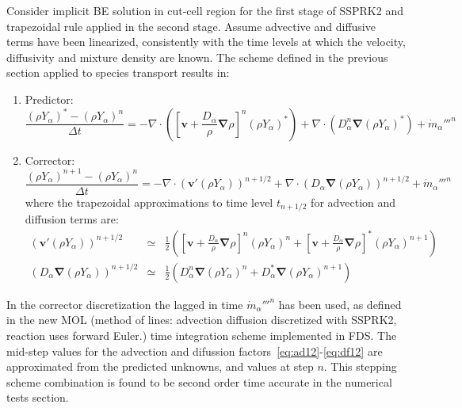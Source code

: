 \documentclass[12pt]{article}
\begin{document}
Consider implicit BE solution in cut-cell region for the first stage of SSPRK2 and trapezoidal rule applied in the second stage. Assume advective and diffusive terms have been linearized, consistently with the time levels at which the velocity, diffusivity and mixture density are known. The scheme defined in the previous section applied to species transport results in:
%
\begin{enumerate}
  \item Predictor: 
%
\begin{equation}
\frac{ (\rho Y_\alpha)^{*} - (\rho Y_\alpha)^n}{\Delta t} = - \nabla \cdot \left(  \left[ \mathbf{v} + 
\frac{D_\alpha}{\rho} \boldsymbol{\nabla} \rho \right]^{n} (\rho Y_\alpha)^{*} \right) + 
\nabla \cdot \left( D_\alpha^n \boldsymbol{\nabla}  (\rho Y_\alpha )^{*} \right) + \dot{m}_\alpha'''^{n} \label{eq:pred}
\end{equation}
%  
  \item Corrector:
%
\begin{equation}
\frac{ (\rho Y_\alpha)^{n+1} - (\rho Y_\alpha)^n}{\Delta t} = - \nabla \cdot \left(  \mathbf{v}' (\rho Y_\alpha) \right)^{n+1/2} + \nabla \cdot \left( D_\alpha \boldsymbol{\nabla}  (\rho Y_\alpha ) \right)^{n+1/2} + \dot{m}_\alpha'''^{n} \label{eq:corr}
\end{equation}
%
where the trapezoidal approximations to time level $t_{n+1/2}$ for advection and diffusion terms are:
%
\begin{eqnarray}
  \left(  \mathbf{v}'(\rho Y_\alpha) \right)^{n+1/2} & \simeq & 
  \frac{1}{2} \left( \left[ \mathbf{v} + \frac{D_\alpha}{\rho} \boldsymbol{\nabla} \rho \right]^n (\rho Y_\alpha)^{n} + 
                           \left[ \mathbf{v} + \frac{D_\alpha}{\rho} \boldsymbol{\nabla} \rho \right]^* (\rho Y_\alpha)^{n+1} \right) 
                           \label{eq:ad12}  \\
  \left( D_\alpha \boldsymbol{\nabla}  (\rho Y_\alpha ) \right)^{n+1/2}   & \simeq &   
  \frac{1}{2} \left(  D_\alpha^{n} \boldsymbol{\nabla}  (\rho Y_\alpha )^{n} + 
                            D_\alpha^* \boldsymbol{\nabla}  (\rho Y_\alpha )^{n+1}  \right) \label{eq:df12} 
\end{eqnarray}
%  
\end{enumerate}
%
In the corrector discretization the lagged in time $\dot{m}_\alpha'''^{n}$ has been used, as defined in the new MOL (method of lines: advection diffusion discretized with SSPRK2, reaction uses forward Euler.) time integration scheme implemented in FDS. The mid-step values for the advection and difussion factors~\eqref{eq:ad12}-\eqref{eq:df12} are approximated from the predicted unknowns, and values at step $n$. This stepping scheme combination is found to be second order time accurate in the numerical tests section. 
\end{document}
